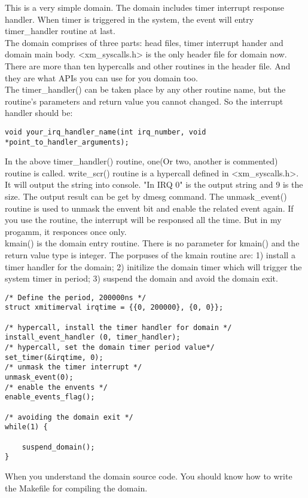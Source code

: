 This is a very simple domain. The domain includes timer interrupt response handler. When timer is triggered in the system, the event will entry timer\_handler routine at last. 
\\
The domain comprises of three parts: head files, timer interrupt hander and domain main body. <xm\_syscalls.h> is the only header file for domain now. There are more than ten hypercalls and other routines in the header file. And they are what APIs you can use for you domain too. \\
The timer\_handler() can be taken place by any other routine name, but the routine's parameters and return value you cannot changed. So the interrupt handler should be:
\begin{verbatim}
void your_irq_handler_name(int irq_number, void *point_to_handler_arguments);
\end{verbatim}
In the above timer\_handler() routine, one(Or two, another is commented) routine is called. write\_scr() routine is a hypercall defined in <xm\_syscalls.h>. It will output the string into console. "In IRQ 0" is the output string and 9 is the size. The output result can be get by dmesg command. The unmask\_event() routine is used to unmask the envent bit and enable the related event again. If you use the routine, the interrupt will be responsed all the time. But in my progamm, it responces once only.
\\
kmain() is the domain entry routine. There is no parameter for kmain() and the return value type is integer. The porpuses of the kmain routine are: 1) install a timer handler for the domain; 2) initilize the domain timer which will trigger the system timer in period; 3) suspend the domain and avoid the domain exit.  
\begin{lstlisting}
/* Define the period, 200000ns */
struct xmitimerval irqtime = {{0, 200000}, {0, 0}};

/* hypercall, install the timer handler for domain */        
install_event_handler (0, timer_handler);
/* hypercall, set the domain timer period value*/
set_timer(&irqtime, 0);
/* unmask the timer interrupt */
unmask_event(0);
/* enable the envents */
enable_events_flag();

/* avoiding the domain exit */
while(1) {
	
	suspend_domain();
}
\end{lstlisting}

When you understand the domain source code. You should know how to write the Makefile for compiling the domain.

